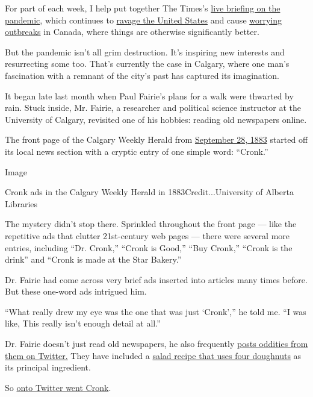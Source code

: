 For part of each week, I help put together The Times's
\href{https://www.nytimes3xbfgragh.onion/news-event/coronavirus}{live
briefing on the pandemic}, which continues to
\href{https://www.nytimes3xbfgragh.onion/interactive/2020/07/23/us/coronavirus-hotspots-countries.html}{ravage
the United States} and cause
\href{https://www.cbc.ca/news/politics/tam-young-people-covid19-virus-fatigue-1.5662206}{worrying
outbreaks} in Canada, where things are otherwise significantly better.

But the pandemic isn't all grim destruction. It's inspiring new
interests and resurrecting some too. That's currently the case in
Calgary, where one man's fascination with a remnant of the city's past
has captured its imagination.

It began late last month when Paul Fairie's plans for a walk were
thwarted by rain. Stuck inside, Mr. Fairie, a researcher and political
science instructor at the University of Calgary, revisited one of his
hobbies: reading old newspapers online.

The front page of the Calgary Weekly Herald from
\href{http://peel.library.ualberta.ca/newspapers/CWH/1883/09/28/1/Ar00103.html}{September
28, 1883} started off its local news section with a cryptic entry of one
simple word: ``Cronk.''

Image

Cronk ads in the Calgary Weekly Herald in 1883Credit...University of
Alberta Libraries

The mystery didn't stop there. Sprinkled throughout the front page ---
like the repetitive ads that clutter 21st-century web pages --- there
were several more entries, including ``Dr. Cronk,'' ``Cronk is Good,''
``Buy Cronk,'' ``Cronk is the drink'' and ``Cronk is made at the Star
Bakery.''

Dr. Fairie had come across very brief ads inserted into articles many
times before. But these one-word ads intrigued him.

``What really drew my eye was the one that was just `Cronk','' he told
me. ``I was like, This really isn't enough detail at all.''

Dr. Fairie doesn't just read old newspapers, he also frequently
\href{https://twitter.com/paulisci}{posts oddities from them on
Twitter.} They have included a
\href{https://twitter.com/paulisci/status/918220378685759488?s=20}{salad
recipe that uses four doughnuts} as its principal ingredient.

So
\href{https://twitter.com/emollick/status/1282802428652466180?s=20}{onto
Twitter went Cronk}.

